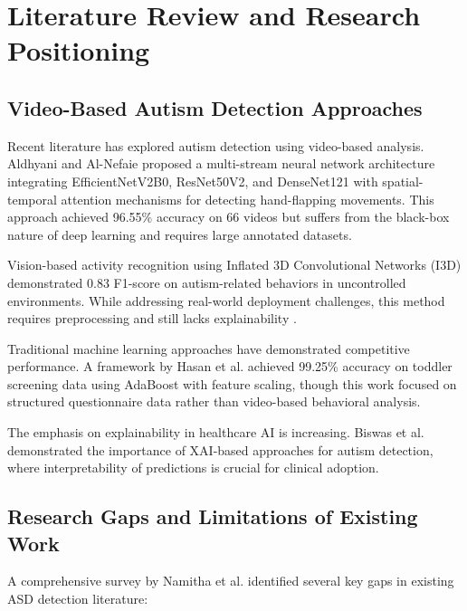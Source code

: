 \documentclass[conference]{IEEEtran}
\begin{document}
\section{Literature Review and Research Positioning}

\subsection{Video-Based Autism Detection Approaches}

Recent literature has explored autism detection using video-based analysis. Aldhyani and Al-Nefaie \cite{aldhyani2025} proposed a multi-stream neural network architecture integrating EfficientNetV2B0, ResNet50V2, and DenseNet121 with spatial-temporal attention mechanisms for detecting hand-flapping movements. This approach achieved 96.55\% accuracy on 66 videos but suffers from the black-box nature of deep learning and requires large annotated datasets.

Vision-based activity recognition using Inflated 3D Convolutional Networks (I3D) \cite{wei2023} demonstrated 0.83 F1-score on autism-related behaviors in uncontrolled environments. While addressing real-world deployment challenges, this method requires preprocessing and still lacks explainability \cite{lokegaonkar2023}.

Traditional machine learning approaches \cite{hasan2023} have demonstrated competitive performance. A framework by Hasan et al. achieved 99.25\% accuracy on toddler screening data using AdaBoost with feature scaling, though this work focused on structured questionnaire data rather than video-based behavioral analysis.

The emphasis on explainability in healthcare AI is increasing. Biswas et al. \cite{biswas} demonstrated the importance of XAI-based approaches for autism detection, where interpretability of predictions is crucial for clinical adoption.

\subsection{Research Gaps and Limitations of Existing Work}

A comprehensive survey by Namitha et al. \cite{survey2026} identified several key gaps in existing ASD detection literature:
\end{document}
